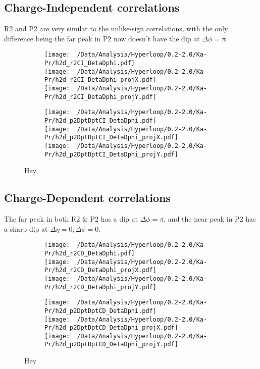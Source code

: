 \documentclass[12pt,a4paper,twoside]{report}
\begin{document}
\subsection{Charge-Independent correlations}
R2 and P2 are very similar to the unlike-sign correlations, with the only difference being the far peak in P2 now doesn't have the dip at $\Delta\phi=\pi$.
\begin{figure}[H]
	\begin{subfigure}{0.49\linewidth}
		\texttt{[image: ~/Data/Analysis/Hyperloop/0.2-2.0/Ka-Pr/h2d\_r2CI\_DetaDphi.pdf]}\\
		\texttt{[image: ~/Data/Analysis/Hyperloop/0.2-2.0/Ka-Pr/h2d\_r2CI\_DetaDphi\_projX.pdf]}\\
		\texttt{[image: ~/Data/Analysis/Hyperloop/0.2-2.0/Ka-Pr/h2d\_r2CI\_DetaDphi\_projY.pdf]}\\
	\end{subfigure}
	\begin{subfigure}{0.49\linewidth}
		\texttt{[image: ~/Data/Analysis/Hyperloop/0.2-2.0/Ka-Pr/h2d\_p2DptDptCI\_DetaDphi.pdf]}\\
		\texttt{[image: ~/Data/Analysis/Hyperloop/0.2-2.0/Ka-Pr/h2d\_p2DptDptCI\_DetaDphi\_projX.pdf]}\\
		\texttt{[image: ~/Data/Analysis/Hyperloop/0.2-2.0/Ka-Pr/h2d\_p2DptDptCI\_DetaDphi\_projY.pdf]}\\
	\end{subfigure}
	\caption{Hey}
\end{figure}
\subsection{Charge-Dependent correlations}
The far peak in both R2 \&  P2 has a dip at $\Delta\phi=\pi$, and the near peak in P2 has a sharp dip at $\Delta\eta=0,\Delta\phi=0$.
\begin{figure}[H]
	\begin{subfigure}{0.49\linewidth}
		\texttt{[image: ~/Data/Analysis/Hyperloop/0.2-2.0/Ka-Pr/h2d\_r2CD\_DetaDphi.pdf]}\\
		\texttt{[image: ~/Data/Analysis/Hyperloop/0.2-2.0/Ka-Pr/h2d\_r2CD\_DetaDphi\_projX.pdf]}\\
		\texttt{[image: ~/Data/Analysis/Hyperloop/0.2-2.0/Ka-Pr/h2d\_r2CD\_DetaDphi\_projY.pdf]}\\
	\end{subfigure}
	\begin{subfigure}{0.49\linewidth}
		\texttt{[image: ~/Data/Analysis/Hyperloop/0.2-2.0/Ka-Pr/h2d\_p2DptDptCD\_DetaDphi.pdf]}\\
		\texttt{[image: ~/Data/Analysis/Hyperloop/0.2-2.0/Ka-Pr/h2d\_p2DptDptCD\_DetaDphi\_projX.pdf]}\\
		\texttt{[image: ~/Data/Analysis/Hyperloop/0.2-2.0/Ka-Pr/h2d\_p2DptDptCD\_DetaDphi\_projY.pdf]}\\
	\end{subfigure}
	\caption{Hey}
\end{figure}
\end{document}
